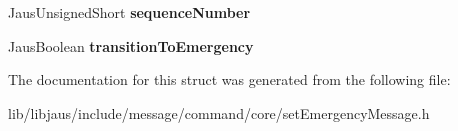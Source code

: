 \begin{DoxyCompactItemize}
\item 
\hypertarget{struct_set_emergency_message_struct_ab6fdeb427e555f1a3f262563b46d454a}{\-Jaus\-Unsigned\-Short {\bfseries sequence\-Number}}\label{struct_set_emergency_message_struct_ab6fdeb427e555f1a3f262563b46d454a}

\item 
\hypertarget{struct_set_emergency_message_struct_a4b8ab1ce6bd8fd2fe8479b28f7db140d}{\-Jaus\-Boolean {\bfseries transition\-To\-Emergency}}\label{struct_set_emergency_message_struct_a4b8ab1ce6bd8fd2fe8479b28f7db140d}

\end{DoxyCompactItemize}


\-The documentation for this struct was generated from the following file\-:\begin{DoxyCompactItemize}
\item 
lib/libjaus/include/message/command/core/set\-Emergency\-Message.\-h\end{DoxyCompactItemize}
